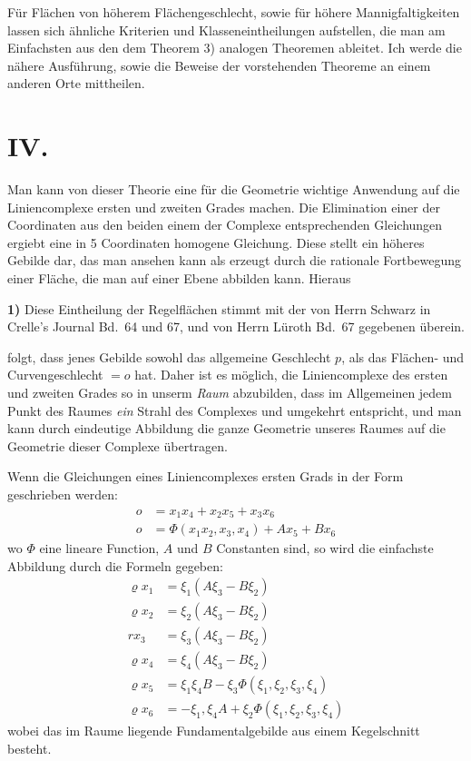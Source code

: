 \documentclass{article}
\begin{document}
Für Flächen von höherem Flächengeschlecht, sowie für höhere Mannigfaltigkeiten lassen sich ähnliche Kriterien und Klasseneintheilungen aufstellen, die man am Einfachsten aus den dem Theorem 3) analogen Theoremen ableitet. Ich werde die nähere Ausführung, sowie die Beweise der vorstehenden Theoreme an einem anderen Orte mittheilen.

\section*{IV.}

Man kann von dieser Theorie eine für die Geometrie wichtige Anwendung auf die Liniencomplexe ersten und zweiten Grades machen. Die Elimination einer der Coordinaten aus den beiden einem der Complexe entsprechenden Gleichungen ergiebt eine in 5 Coordinaten homogene Gleichung. Diese stellt ein höheres Gebilde dar, das man ansehen kann als erzeugt durch die rationale Fortbewegung einer Fläche, die man auf einer Ebene abbilden kann. Hieraus

\textbf{1)} Diese Eintheilung der Regelflächen stimmt mit der von Herrn Schwarz in Crelle's Journal Bd.\ 64 und 67, und von Herrn Lüroth Bd.\ 67 gegebenen überein.

folgt, dass jenes Gebilde sowohl das allgemeine Geschlecht $p$, als das Flächen- und Curvengeschlecht $= o$ hat. Daher ist es möglich, die Liniencomplexe des ersten und zweiten Grades so in unserm \emph{Raum} abzubilden, dass im Allgemeinen jedem Punkt des Raumes \emph{ein} Strahl des Complexes und umgekehrt entspricht, und man kann durch eindeutige Abbildung die ganze Geometrie unseres Raumes auf die Geometrie dieser Complexe übertragen.

Wenn die Gleichungen eines Liniencomplexes ersten Grads in der Form geschrieben werden:
\[
\begin{aligned}
o &= x_1 x_4 + x_2 x_5 + x_3 x_6 \\
o &= \Phi(x_1 x_2, x_3, x_4) + A x_5 + B x_6
\end{aligned}
\tag{3}
\]
wo $\Phi$ eine lineare Function, $A$ und $B$ Constanten sind, so wird die einfachste Abbildung durch die Formeln gegeben:
\[
\begin{aligned}
\varrho x_1 &= \xi_1 (A\xi_3 - B\xi_2) \\
\varrho x_2 &= \xi_2 (A\xi_3 - B\xi_2) \\
r x_3 &= \xi_3 (A\xi_3 - B\xi_2) \\
\varrho x_4 &= \xi_4 (A\xi_3 - B\xi_2) \\
\varrho x_5 &= \xi_1 \xi_4 B - \xi_3 \Phi(\xi_1, \xi_2, \xi_3, \xi_4) \\
\varrho x_6 &= - \xi_1, \xi_4 A + \xi_2 \Phi(\xi_1, \xi_2, \xi_3, \xi_4)
\end{aligned}
\tag{4}
\]
wobei das im Raume liegende Fundamentalgebilde aus einem Kegelschnitt besteht.
\end{document}

